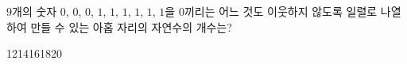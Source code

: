\hspace*{2mm}\begin{minipage}[t]{\dimexpr\linewidth-2mm\relax}\vspace{0pt}
$9$개의 숫자 $0$, $0$, $0$, $1$, $1$, $1$, $1$, $1$, $1$을 $0$끼리는 어느 것도 이웃하지 않도록 일렬로 나열하여 만들 수 있는 아홉 자리의 자연수의 개수는?
\begin{choices32}{12}{14}{16}{18}{20}\end{choices32}\end{minipage}
